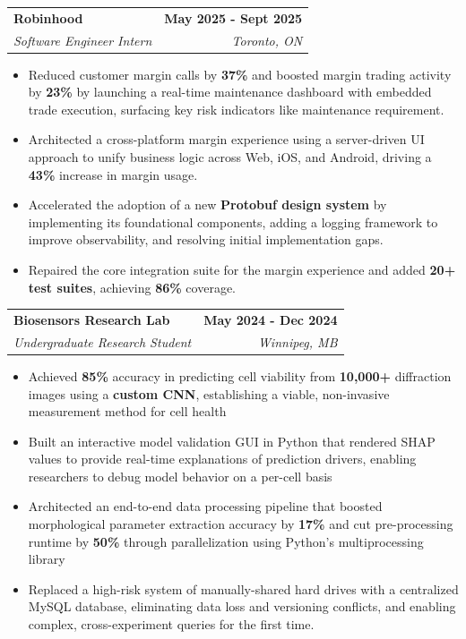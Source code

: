 \documentclass[11pt]{article}
\makeatletter
\newcommand{\resumeItem}[1]{
  \item\small{
    {\fontfamily{lmss}#1 \vspace{-2pt}}
  }
}
\newcommand{\resumeSubheadingUpd}[4]{
  \vspace{2pt}\item
    \begin{tabular*}{0.95\textwidth}[t]{l@{\extracolsep{\fill}}r}
      \hspace{1.2em}\textbf{#1} & {\bfseries #2} \\
      \hspace{1.25em}\textit{\small#3} & \textit{\small#4}
    \end{tabular*}\vspace{-7pt}
}
\newcommand{\resumeItemListStart}{\begin{itemize}}
\newcommand{\resumeItemListEnd}{\end{itemize}\vspace{-5pt}}
\makeatother
\begin{document}
    \resumeSubheadingUpd{Robinhood}{May 2025 - Sept 2025}{Software Engineer Intern}{Toronto, ON}
      \vspace{0.3em}
      \resumeItemListStart
        \resumeItem{Reduced customer margin calls by \textbf{37\%} and boosted margin trading activity by \textbf{23\%} by launching a real-time maintenance dashboard with embedded trade execution, surfacing key risk indicators like maintenance requirement.}
        \resumeItem{Architected a cross-platform margin experience using a server-driven UI approach to unify business logic across Web, iOS, and Android, driving a \textbf{43\%} increase in margin usage.}
        \resumeItem{Accelerated the adoption of a new \textbf{Protobuf design system} by implementing its foundational components, adding a logging framework to improve observability, and resolving initial implementation gaps.}
        \resumeItem{Repaired the core integration suite for the margin experience and added \textbf{20+ test suites}, achieving \textbf{86\%} coverage.}
      \resumeItemListEnd

    \resumeSubheadingUpd{Biosensors Research Lab}{May 2024 - Dec 2024}{Undergraduate Research Student}{Winnipeg, MB}
      \vspace{0.3em}
      \resumeItemListStart
        \resumeItem{Achieved \textbf{85\%} accuracy in predicting cell viability from \textbf{10,000+} diffraction images using a \textbf{custom CNN}, establishing a viable, non-invasive measurement method for cell health}
        \resumeItem{Built an interactive model validation GUI in Python that rendered SHAP values to provide real-time explanations of prediction drivers, enabling researchers to debug model behavior on a per-cell basis}
        \resumeItem{Architected an end-to-end data processing pipeline that boosted morphological parameter extraction accuracy by \textbf{17\%} and cut pre-processing runtime by \textbf{50\%} through parallelization using Python's multiprocessing library}
        \resumeItem{Replaced a high-risk system of manually-shared hard drives with a centralized MySQL database, eliminating data loss and versioning conflicts, and enabling complex, cross-experiment queries for the first time.}
      \resumeItemListEnd
\end{document}

